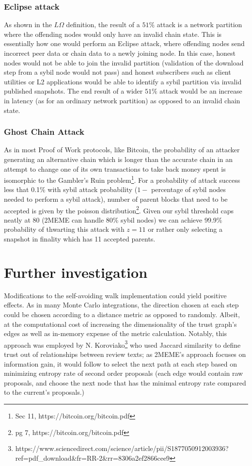\documentclass{article}
\begin{document}
\subsubsection{Eclipse attack}
As shown in the $L\Omega$ definition, the result of a $51\%$ attack is a network partition where the offending nodes would only have an invalid chain state. This is essentially how one would perform an Eclipse attack, where offending nodes send incorrect peer data or chain data to a newly joining node. In this case, honest nodes would not be able to join the invalid partition (validation of the download step from a sybil node would not pass) and honest subscribers such as client utilities or L2 applications would be able to identify a sybil partition via invalid published snapshots. The end result of a wider $51\%$ attack would be an increase in latency (as for an ordinary network partition) as opposed to an invalid chain state.

\subsubsection{Ghost Chain Attack}
As in most Proof of Work protocols, like Bitcoin, the probability of an attacker generating an alternative chain which is longer than the accurate chain in an attempt to change one of its own transactions to take back money spent is isomorphic to the Gambler's Ruin problem\footnote{Sec 11, https://bitcoin.org/bitcoin.pdf}. For a probability of attack success less that 0.1\% with sybil attack probability ($1-$ percentage of sybil nodes needed to perform a sybil attack), number of parent blocks that need to be accepted is given by the poisson distribution\footnote{pg 7, https://bitcoin.org/bitcoin.pdf}. Given our sybil threshold caps neatly at 80 (2MEME can handle 80\% sybil nodes) we can achieve 99.9\% probability of thwarting this attack with $z=11$ or rather only selecting a snapshot in finality which has 11 accepted parents.

\section{Further investigation}
	Modifications to the self-avoiding walk implementation could yield positive effects. As in many Monte Carlo integrations, the direction chosen at each step could be chosen according to a distance metric as opposed to randomly. Albeit, at the computational cost of increasing the dimensionality of the trust graph’s edges as well as in-memory expense of the metric calculation. Notably, this approach was employed by N. Koroviako\footnote{https://www.sciencedirect.com/science/article/pii/S1877050912003936?ref=pdf\_download\&fr=RR-2\&rr=8306a2ef2866cee9} who used Jaccard similarity to define trust out of relationships between review texts; as 2MEME's approach focuses on information gain, it would follow to select the next path at each step based on minimizing entropy rate of second order proposals (each edge would contain raw proposals, and choose the next node that has the minimal entropy rate compared to the current’s proposals.)
	
\end{document}
